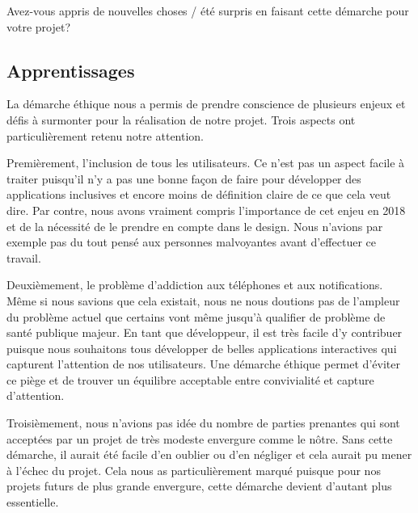 Avez-vous appris de nouvelles choses / été surpris en faisant cette démarche pour votre projet?
\subsection{Apprentissages}
La démarche éthique nous a permis de prendre conscience de plusieurs enjeux et défis à surmonter pour la réalisation de notre projet. Trois aspects ont particulièrement retenu notre attention.

Premièrement, l'inclusion de tous les utilisateurs. Ce n'est pas un aspect facile à traiter puisqu'il n'y a pas une bonne façon de faire pour développer des applications inclusives et encore moins de définition claire de ce que cela veut dire. Par contre, nous avons vraiment compris l'importance de cet enjeu en 2018 et de la nécessité de le prendre en compte dans le design. Nous n'avions par exemple pas du tout pensé aux personnes malvoyantes avant d'effectuer ce travail. 

Deuxièmement, le problème d'addiction aux téléphones et aux notifications. Même si nous savions que cela existait, nous ne nous doutions pas de l'ampleur du problème actuel que certains vont même jusqu'à qualifier de problème de santé publique majeur. En tant que développeur, il est très facile d'y contribuer puisque nous souhaitons tous développer de belles applications interactives qui capturent l'attention de nos utilisateurs. Une démarche éthique permet d'éviter ce piège et de trouver un équilibre acceptable entre convivialité et capture d'attention.

Troisièmement, nous n'avions pas idée du nombre de parties prenantes qui sont acceptées par un projet de très modeste envergure comme le nôtre.  Sans cette démarche, il aurait été facile d'en oublier ou d'en négliger et cela aurait pu mener à l'échec du projet. Cela nous as particulièrement marqué puisque pour nos projets futurs de plus grande envergure, cette démarche devient d'autant plus essentielle.

